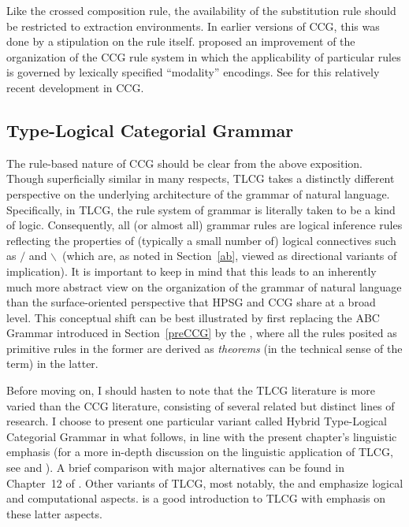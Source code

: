 \documentclass[output=paper
                ,modfonts
 	        ,biblatex
                ,babelshorthands
                ,newtxmath
                ,draftmode
                ,colorlinks, citecolor=brown
]{langscibook}
\begin{document}
Like the crossed composition rule, the availability of the
substitution rule should be restricted to extraction environments. In
earlier versions of CCG, this was done by a stipulation on
the rule itself. \citet{Baldridge2002a-u} proposed an improvement of the
organization of the CCG rule system in which the applicability of
particular rules is governed by lexically specified ``modality''
encodings. See \citet{steedman2011ccg} for this relatively recent
development in CCG.

\subsection{Type-Logical Categorial Grammar \label{sectlg}}

The rule-based nature of CCG should be clear from the above
exposition. Though superficially similar in many respects,
TLCG takes a distinctly different perspective on the
underlying architecture of the grammar of natural language.
Specifically, in TLCG, the rule system of grammar is literally taken
to be a kind of logic. Consequently, all (or almost all) grammar rules are logical
inference rules reflecting the properties of (typically a small number
of) logical connectives such as \ensuremath{/} and
\ensuremath{\backslash}\ (which are, as noted in Section~\ref{ab}, viewed as
directional variants of implication).
It is important to keep in mind that this leads to
an inherently much more abstract view on the
organization of the grammar of natural language than the
surface-oriented perspective that HPSG and CCG share
at a broad level. This conceptual shift can be
best illustrated by first replacing the ABC Grammar introduced in
Section~\ref{preCCG} by the , where all the rules
posited as primitive rules in the former are derived as \emph{theorems} (in
the technical sense of the term) in the latter.

Before moving on, I should hasten to note that the TLCG literature is
more varied than the CCG literature, consisting of several related but
distinct lines of research. I choose to present one particular variant
called Hybrid Type-Logical Categorial Grammar \citep{KubotaLevineBook}
in what follows, in line with the present chapter's linguistic
emphasis (for a more in-depth discussion on the linguistic application
of TLCG, see \citealt{Carpenter98a-u} and \citealt{KubotaLevineBook}).
A brief comparison with major alternatives
can be found in Chapter~12 of \citet{KubotaLevineBook}. 
Other variants of TLCG, most notably, the
 \citep{Moortgat2011a-u} and
 \citep{morrill2011} emphasize logical
and computational aspects. \citet{mootretore2012} is a good
introduction to TLCG with emphasis on these latter aspects.
\end{document}
